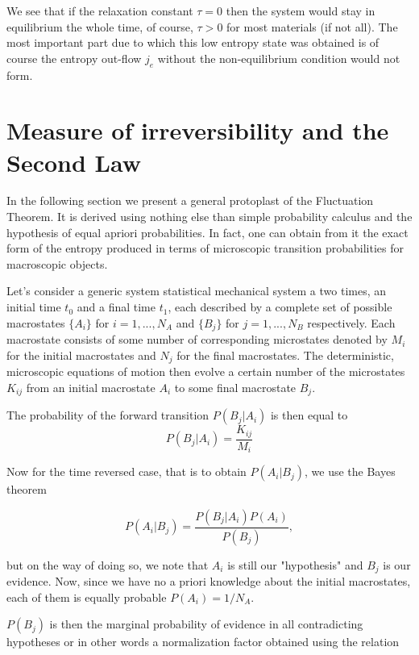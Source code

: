 \documentclass[a4paper,12pt]{article}
\begin{document}
We see that if the relaxation constant $\tau = 0$ then the system would stay in equilibrium the whole time, of course, $\tau > 0$ for most materials (if not all). The most important part due to which this low entropy state was obtained is of course the entropy out-flow $j_e$ without the non-equilibrium condition would not form.

\section{Measure of irreversibility and the Second Law}
\label{IrreversibilityMeasure}
In the following section we present a general protoplast of the Fluctuation Theorem. It is derived using nothing else than simple probability calculus and the hypothesis of equal apriori probabilities.
In fact, one can obtain from it the exact form of the entropy produced in terms of microscopic transition probabilities for macroscopic objects.

Let's consider a generic system statistical mechanical system a two times, an initial time $t_0$ and a final time $t_1$, each described by a complete set of possible macrostates $\{A_i\}$ for $ i=1,...,N_A $ and $\{B_j\}$ for $ j=1,...,N_B $  respectively. Each macrostate consists of some number of corresponding microstates denoted by $M_i$ for the initial macrostates and $N_j$ for the final macrostates. The deterministic, microscopic equations of motion then evolve a certain number of the microstates $K_{ij}$ from an initial macrostate $A_i$ to some final macrostate $B_j$.

The probability of the forward transition $P(B_j|A_i)$ is then equal to
\begin{equation}
  P(B_j|A_i)= \frac{K_{ij}}{M_i}
\end{equation}

Now for the time reversed case, that is to obtain $P(A_i|B_j)$, we use the Bayes theorem

\begin{equation}
  P(A_i|B_j)=\frac{P(B_j|A_i)P(A_i)}{P(B_j)},
\end{equation}

but on the way of doing so, we note that $A_i$ is still our "hypothesis" and $B_j$ is our evidence. Now, since we have no a priori knowledge about the initial macrostates, each of them is equally probable $P(A_i)= 1/N_A$.

$P(B_j)$ is then the marginal probability of evidence in all contradicting hypotheses or in other words a normalization factor obtained using the relation 
\end{document}
